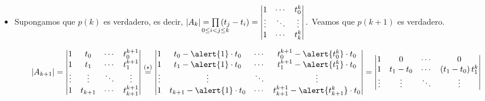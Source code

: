 \begin{frame}
\begin{solution}
\begin{itemize}
			\item

			      Supongamos que $p\left(k\right)$ es verdadero,
			      es decir,
			      \begin{math}
				      \left|
				      A_{k}
				      \right|=
				      \prod\limits_{\mathclap{0\leq i< j\leq k}}
				      \left(t_{j}-t_{i}\right)=
				      \begin{vmatrix}
					      1      & \cdots & t_{0}^{k} \\
					      \vdots & \ddots & \vdots    \\
					      1      & \cdots & t_{k}^{k}
				      \end{vmatrix}.
			      \end{math}
			      Veamos que $p\left(k+1\right)$ es verdadero.

			      \begin{align*}
				      \left|
				      A_{k+1}
				      \right| & =
				      \begin{vmatrix}
					      1      & t_{0}   & \cdots & t_{0}^{k+1}   \\
					      1      & t_{1}   & \cdots & t_{1}^{k+1}   \\
					      \vdots & \vdots  & \ddots & \vdots        \\
					      1      & t_{k+1} & \cdots & t_{k+1}^{k+1}
				      \end{vmatrix}
				      \overset{\left(\star\right)}{=}
				      \begin{vmatrix}
					      1      & t_{0}-\alert{1}\cdot t_{0}   & \cdots & t_{0}^{k+1}-\alert{t_{0}^{k}}\cdot t_{0}     \\
					      1      & t_{1}-\alert{1}\cdot t_{0}   & \cdots & t_{1}^{k+1}-\alert{t_{1}^{k}}\cdot t_{0}     \\
					      \vdots & \vdots                       & \ddots & \vdots                                       \\
					      1      & t_{k+1}-\alert{1}\cdot t_{0} & \cdots & t_{k+1}^{k+1}-\alert{t_{k+1}^{k}}\cdot t_{0}
				      \end{vmatrix}=
				      \begin{vmatrix}
					      1      & 0             & \cdots & 0                                   \\
					      1      & t_{1}-t_{0}   & \cdots & \left(t_{1}-t_{0}\right)t_{1}^{k}   \\
					      \vdots & \vdots        & \ddots & \vdots                              \\

\end{vmatrix}
\end{align*}
\end{itemize}
\end{solution}
\end{frame}
